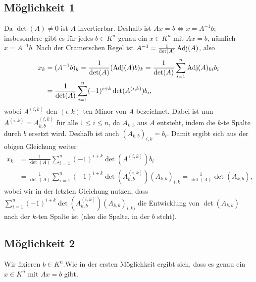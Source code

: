 \documentclass[a4paper,10pt]{article}
\begin{document}
\section{}



\subsection*{Möglichkeit 1}
Da $\det(A) \neq 0$ ist $A$ invertierbar. Deshalb ist $Ax = b \iff x = A^{-1} b$; insbesondere gibt es für jedes $b \in K^n$ genau ein $x \in K^n$ mit $Ax = b$, nämlich $x = A^{-1} b$. Nach der Cramerschen Regel ist $A^{-1} = \frac{1}{\det(A)} \operatorname{Adj}(A)$, also
\begin{align*}
 x_k
 &= (A^{-1} b)_k
 = \frac{1}{\det(A)} (\operatorname{Adj}(A) b)_k
 = \frac{1}{\det(A)} \sum_{i=1}^n \operatorname{Adj}(A)_{ki} b_i \\
 &= \frac{1}{\det(A)} \sum_{i=1}^n (-1)^{i+k} \det(A^{(i,k)}) b_i,
\end{align*}
wobei $A^{(i,k)}$ den $(i,k)$-ten Minor von $A$ bezeichnet. Dabei ist nun $A^{(i,k)} = A_{k,b}^{(i,k)}$ für alle $1 \leq i \leq n$, da $A_{k,b}$ aus $A$ entsteht, indem die $k$-te Spalte durch $b$ ersetzt wird. Deshalb ist auch $(A_{k,b})_{i,k} = b_i$. Damit ergibt sich aus der obigen Gleichung weiter
\begin{align*}
 x_k
 &= \frac{1}{\det(A)} \sum_{i=1}^n (-1)^{i+k} \det(A^{(i,k)}) b_i \\
 &= \frac{1}{\det(A)} \sum_{i=1}^n (-1)^{i+k} \det(A_{k,b}^{(i,k)}) (A_{k,b})_{i,k}
 = \frac{1}{\det(A)} \det(A_{k,b}),
\end{align*}
wobei wir in der letzten Gleichung nutzen, dass $\sum_{i=1}^n (-1)^{i+k} \det(A_{k,b}^{(i,k)}) (A_{k,b})_{i,k)}$ die Entwicklung von $\det(A_{k,b})$ nach der $k$-ten Spalte ist (also die Spalte, in der $b$ steht).



\subsection*{Möglichkeit 2}
Wir fixieren $b \in K^n$.Wie in der ersten Möglichkeit ergibt sich, dass es genau ein $x \in K^n$ mit $Ax = b$ gibt.
\end{document}
